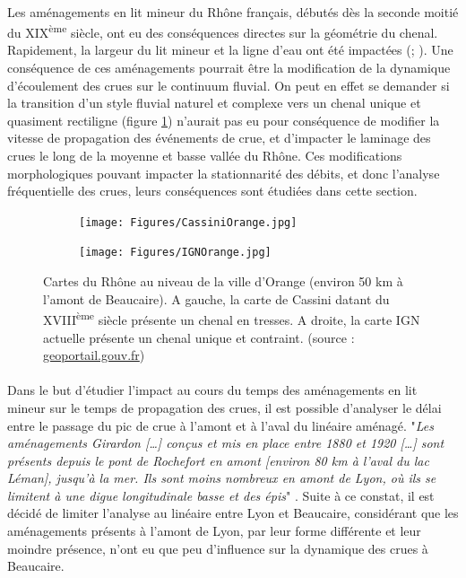 \documentclass[11pt]{article}
\begin{document}
	\paragraph{} Les aménagements en lit mineur du Rhône français, débutés dès la seconde moitié du XIX\textsuperscript{ème} siècle, ont eu des conséquences directes sur la géométrie du chenal. Rapidement, la largeur du lit mineur et la ligne d'eau ont été impactées (\cite{gaydou_schema_2013}; \cite{piegay_observatoire_2022}). Une conséquence de ces aménagements pourrait être la modification de la dynamique d'écoulement des crues sur le continuum fluvial. On peut en effet se demander si la transition d'un style fluvial naturel et complexe vers un chenal unique et quasiment rectiligne (figure \ref{fig:CartesChenal}) n'aurait pas eu pour conséquence de modifier la vitesse de propagation des événements de crue, et d'impacter le laminage des crues le long de la moyenne et basse vallée du Rhône. Ces modifications morphologiques pouvant impacter la stationnarité des débits, et donc l'analyse fréquentielle des crues, leurs conséquences sont étudiées dans cette section.
	
	\begin{figure}[h]
		\centering
		\begin{subfigure}{0.4\linewidth}
			\texttt{[image: Figures/CassiniOrange.jpg]}
		\end{subfigure}
		\begin{subfigure}{0.4\linewidth}
			\texttt{[image: Figures/IGNOrange.jpg]}
		\end{subfigure}
		\caption{Cartes du Rhône au niveau de la ville d'Orange (environ 50 km à l'amont de Beaucaire). A gauche, la carte de Cassini datant du XVIII\textsuperscript{ème} siècle présente un chenal en tresses. A droite, la carte IGN actuelle présente un chenal unique et contraint. (source : \url{geoportail.gouv.fr})}
		\label{fig:CartesChenal}
	\end{figure}
	
	\paragraph{} Dans le but d'étudier l'impact au cours du temps des aménagements en lit mineur sur le temps de propagation des crues, il est possible d'analyser le délai entre le passage du pic de crue à l'amont et à l'aval du linéaire aménagé. "\textit{Les aménagements Girardon […] conçus et mis en place entre 1880 et 1920 […] sont présents depuis le pont de Rochefort en amont [environ 80 km à l'aval du lac Léman], jusqu'à la mer. Ils sont moins nombreux en amont de Lyon, où ils se limitent à une digue longitudinale basse et des épis}" \citep{gaydou_schema_2013}. Suite à ce constat, il est décidé de limiter l'analyse au linéaire entre Lyon et Beaucaire, considérant que les aménagements présents à l'amont de Lyon, par leur forme différente et leur moindre présence, n'ont eu que peu d'influence sur la dynamique des crues à Beaucaire.
	
\end{document}
